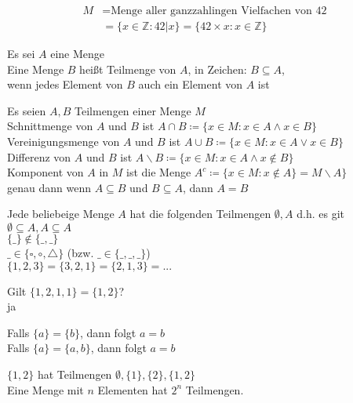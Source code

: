 \documentclass[a4paper, markcase = upper, parskip = true, fleqn]{scrartcl}
\begin{document}
\begin{exercisebox}
	\begin{align*}
		M &= \text{Menge aller ganzzahlingen Vielfachen von 42}\\
		~ &= \{x \in \mathbb{Z} : 42\vert x\} = \{42\times x : x \in \mathbb{Z}\}
	\end{align*}
	\begin{definitionbox}
		Es sei $A$ eine Menge\\
		Eine Menge $B$ heißt Teilmenge von $A$, in Zeichen: $B \subseteq A$,\\
		wenn jedes Element von $B$ auch ein Element von $A$ ist
	\end{definitionbox}
	\begin{definitionbox}
		Es seien $A, B$ Teilmengen einer Menge $M$\\
		Schnittmenge von $A$ und $B$ ist $A \cap B \coloneqq \{x \in M : x\in A \wedge x \in B\}$\\
		Vereinigungsmenge von $A$ und $B$ ist $A \cup B \coloneqq \{x \in M : x\in A \vee x \in B\}$\\
		Differenz von $A$ und $B$ ist $A \backslash B \coloneqq \{x \in M : x\in A \wedge x \notin B\}$\\
		Komponent von $A$ in $M$ ist die Menge $A^c \coloneqq \{x \in M : x \notin A \} = M \backslash A\}$\\
		genau dann wenn $A \subseteq B$ und $B \subseteq A$, dann $A = B$
	\end{definitionbox}
\end{exercisebox}
Jede beliebeige Menge $A$ hat die folgenden Teilmengen $\emptyset, A$ d.h. es git $\emptyset \subseteq A,A \subseteq A$\\
$\{\_\} \notin \{\_,\_\}$\\
$\_ \in \{\square, \circ, \triangle\}$ (bzw. $\_ \in \{\_, \_, \_\}$)\\
$\{1, 2, 3\} = \{3, 2, 1\} = \{2, 1, 3\} = ...$
\begin{exercisebox}
	Gilt $\{1, 2, 1, 1\} = \{1, 2\}$?\\
	\indent\indent ja
\end{exercisebox}
\begin{exercisebox}
	Falls $\{a\} = \{b\}$, dann folgt $a = b$\\
	Falls $\{a\} = \{a, b\}$, dann folgt $a = b$
\end{exercisebox}
$\{1, 2\}$ hat Teilmengen $\emptyset, \{1\}, \{2\}, \{1, 2\}$\\
Eine Menge mit $n$ Elementen hat $2^n$ Teilmengen.
\end{document}
